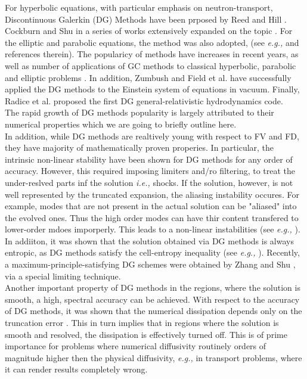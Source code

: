 For hyperbolic equations, with particular emphasis on neutron-transport, Discontinuous Galerkin (DG) Methods have been prposed by Reed and Hill \cite{Reed:1973}. Cockburn and Shu in a series of works extensively expanded on the topic \cite{Cockburn:1991,Cockburn:1989ii,Cockburn:1989iii,Cockburn:1990iv,Cockburn:1998v}. For the elliptic and parabolic equations, the method was also adopted, (see \textit{e.g.,} \cite{Arnold:2002} and references therein). The popularicy of methods have increases in recent years, as well as number of applications of GC methods to classical hyperbolic, parabolic and elliptic problems \cite{Cockburn:2000,Canuto:2008,Hesthaven:2007}. In addition, Zumbush \cite{Zumbusch:2009fe} and Field et al. \cite{Field:2010} have successfully applied the DG methods to the Einstein system of equations in vacuum. Finally, Radice et al. \cite{Radice:2011qr} proposed the first DG general-relativistic hydrodynamics code. \\

The rapid growth of DG methods popularity is largely attributed to their numerical properties which we are going to briefly outline here. \\

In addition, while DG methods are realtively young with respect to FV and FD, they have majority of mathematically proven properies. In particular, the intrinsic non-linear stability have been shown for DG methods for any order of accuracy. However, this required imposing limiters and/ro filtering, to treat the under-reslved parts inf the solution \textit{i.e.,} shocks. If the solution, however, is not well represented by the truncated expansion, the aliasing instability occures. For example, modes that are not present in the actual solution can be "aliased" into the evolved ones. Thus the high order modes can have thir content transfered to lower-order mdoes imporperly. This leads to a non-linear instabilities (see \textit{e.g.,} \cite{Boyd:2001}). In addiiton, it was shown that the solution obtained via DG methods is always entropic, as DG methods satisfy the cell-entropy inequality (see \textit{e.g.,} \cite{Cockburn:2003}). Recently, a maximum-principle-satisfying DG schemes were obtained by Zhang and Shu \cite{Zhang:2011}, via a special limiting technique. \\

Another important property of DG methods in the regions, where the solution is smooth, a high, spectral accuracy can be achieved. With respect to the accuracy of DG methods, it was shown that the numerical dissipation depends only on the truncation error \cite{Cockburn:2003}. This in turn implies that in regions where the solution is smooth and resolved, the dissipation is effectively turned off. This is of prime importance for problems where numerical diffusivity routinely orders of magnitude higher then the physical diffusivity, \textit{e.g.,} in transport problems, where it can render results completely wrong. \\

